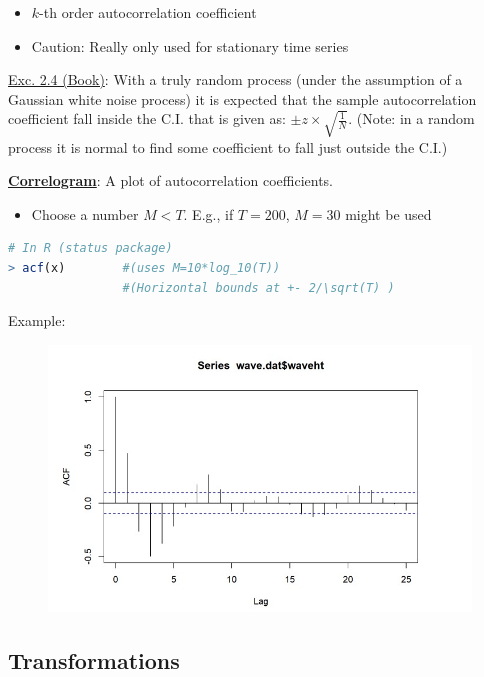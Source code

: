 \begin{itemize}
    \item $k$-th order autocorrelation coefficient
    \item Caution: Really only used for stationary time series
\end{itemize}

\underline{Exc. 2.4 (Book)}: \quad With a truly random process (under the assumption of a Gaussian white noise process) it is expected that the sample autocorrelation coefficient fall inside the C.I. that is given as: $\pm z\times \sqrt{\frac{1}{N}}$. (Note: in a random process it is normal to find some coefficient to fall just outside the C.I.)


\textbf{\underline{Correlogram}}: \quad A plot of autocorrelation coefficients.

\begin{itemize}
    \item Choose a number $M<T$. E.g., if $T=200$, $M=30$ might be used
\end{itemize}

\begin{lstlisting}[language=R]
# In R (status package)
> acf(x)        #(uses M=10*log_10(T))
                #(Horizontal bounds at +- 2/\sqrt(T) )
\end{lstlisting}

Example:

\begin{figure}[h]
\includegraphics[scale=0.4]{images/Screenshot 2024-03-30 at 17.42.36.jpg}
\centering
\end{figure}


\subsection{Transformations}

